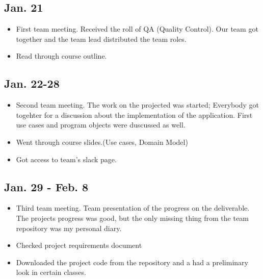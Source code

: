 \documentclass[12pt]{article}
\begin{document}
\maketitle

\subsection*{Jan. 21 }

\begin{itemize}
  \item First team meeting. Received the roll of QA (Quality Control).
        Our team got together and the team lead distributed the team roles.
  \item Read through course outline.
\end{itemize}

\subsection*{Jan. 22-28 }

\begin{itemize}
  \item Second team meeting. The work on the projected was started; Everybody got togehter for a discussion about the implementation of        the application. First use cases and program objects were duscussed as well.
  \item Went through course slides.(Use cases, Domain Model) 
  \item Got access to team's slack page.
  \end{itemize}

\subsection*{Jan. 29 - Feb. 8}

\begin{itemize}
  \item Third team meeting. Team presentation of the progress on the deliverable. The projects progress was good, but the only missing thing from the team repository was my personal diary.
  \item Checked project requirements document
  \item Downloaded the project code from the repository and a had a preliminary look in certain classes. 
\end{itemize}
\end{document}
